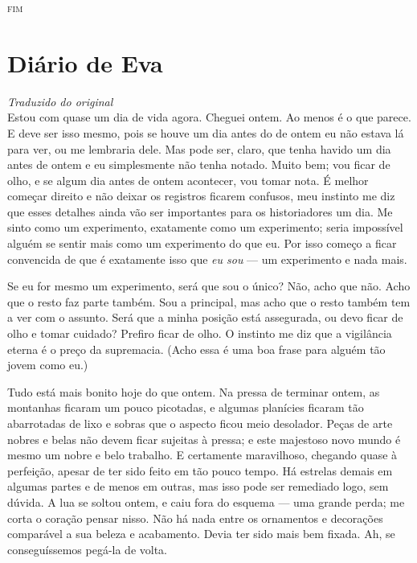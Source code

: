 \begin{center}
\textsc{fim}
\end{center}




\chapter{Diário de Eva}
\medskip

{\small
\hfill\textit{Traduzido do original}
}
\\

 Estou com quase um dia de vida agora. Cheguei ontem. Ao menos é o que
parece. E deve ser isso mesmo, pois se houve um dia antes do de ontem
eu não estava lá para ver, ou me lembraria dele. Mas pode ser, claro, que tenha
havido um dia antes de ontem e eu simplesmente não tenha notado. Muito
bem; vou ficar de olho, e se algum dia antes de ontem acontecer, vou tomar
nota. É melhor começar direito e não deixar os registros ficarem confusos,
meu instinto me diz que esses detalhes ainda vão ser importantes para os
historiadores um dia. Me sinto como um experimento, exatamente como um
experimento; seria impossível alguém se sentir mais como um experimento do que
eu. Por isso começo a ficar convencida de que é exatamente isso que \textit{eu sou} --- um
experimento e nada mais.

Se eu for mesmo um experimento, será que sou o único? Não, acho que não. Acho que o
resto faz parte também. Sou a principal, mas acho que o resto também tem a ver
com o assunto. Será que a minha posição está assegurada, ou devo ficar de olho e
tomar cuidado? Prefiro ficar de olho. O instinto me diz que a vigilância
eterna é o preço da supremacia. (Acho essa é uma boa frase para alguém tão
jovem como eu.)

Tudo está mais bonito hoje do que ontem. Na pressa de terminar ontem, as
montanhas ficaram um pouco picotadas, e algumas planícies ficaram tão
abarrotadas de lixo e sobras que o aspecto ficou meio desolador. Peças de arte
nobres e belas não devem ficar sujeitas à pressa; e este majestoso novo mundo é
mesmo um nobre e belo trabalho. E certamente maravilhoso, chegando quase à
perfeição, apesar de ter sido feito em tão pouco tempo. Há estrelas demais em algumas partes
e de menos em outras, mas isso pode ser remediado logo, sem dúvida. A lua se
soltou ontem, e caiu fora do esquema --- uma grande perda; me corta o
coração pensar nisso. Não há nada entre os ornamentos e decorações
comparável a sua beleza e acabamento. Devia ter sido mais bem fixada. Ah, se
conseguíssemos pegá-la de volta.

